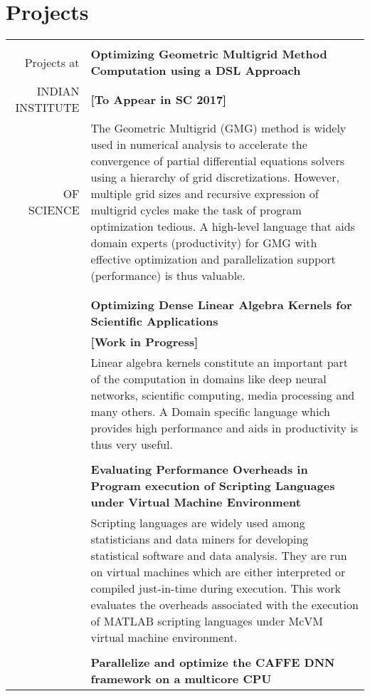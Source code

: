 \documentclass[a4paper,10pt]{article} %
\begin{document}
\section{Projects}
\begin{tabular}{rp{13cm}}
&\\
Projects at & \textbf{Optimizing Geometric Multigrid Method Computation using a DSL Approach} \\
INDIAN INSTITUTE & \hspace{25em} \textbf{[To Appear in SC 2017]} \\
OF SCIENCE 
& \setlength{\leftskip}{0.4cm}
The Geometric Multigrid (GMG) method is widely used in numerical analysis to accelerate the convergence of partial differential equations solvers using
a hierarchy of grid discretizations. However, multiple grid sizes and recursive 
expression of multigrid cycles make the task of program optimization tedious.
A high-level language that aids domain experts (productivity) for GMG with
effective optimization and parallelization support (performance) is thus valuable.\\
& \\
& \\
& \textbf{Optimizing Dense Linear Algebra Kernels for Scientific Applications} \\
& \hspace{25em} \textbf{[Work in Progress]}\\
& \setlength{\leftskip}{0.4cm}
Linear algebra kernels constitute an important part of the computation in domains like deep neural networks, scientific computing, media processing and many others. A Domain specific language which provides high performance and aids in productivity is thus very useful.\\
&\\
& \textbf{Evaluating Performance Overheads in Program execution of Scripting Languages under Virtual Machine Environment} \\
& \setlength{\leftskip}{0.4cm}
Scripting languages are widely used among statisticians and data miners for developing statistical software and data analysis. They are run on virtual machines which are either interpreted or compiled just-in-time during execution. This work evaluates the overheads associated with the execution of MATLAB scripting languages under McVM virtual machine environment.\\
& \\
& \textbf{Parallelize and optimize the CAFFE DNN framework on a multicore CPU}\\

\end{tabular}
\end{document}
